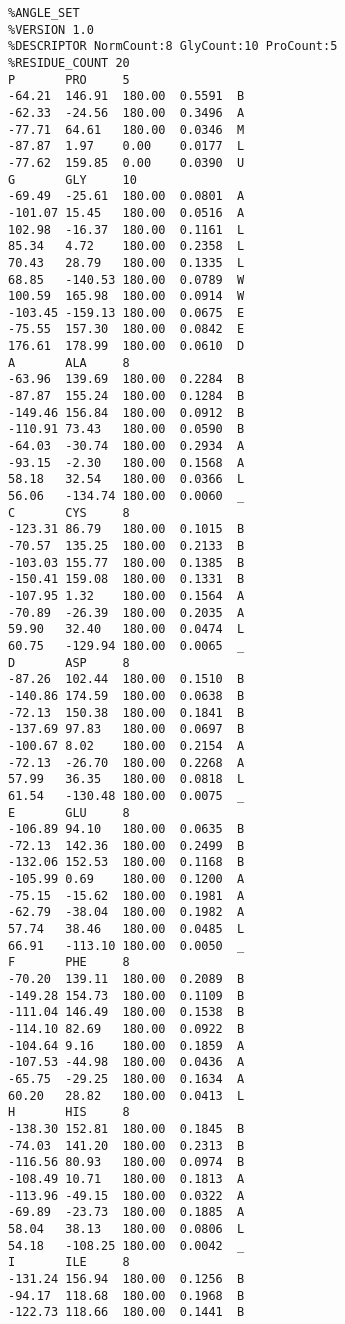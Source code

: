 \begin{small}
\begin{verbatim}
%ANGLE_SET
%VERSION 1.0
%DESCRIPTOR NormCount:8 GlyCount:10 ProCount:5
%RESIDUE_COUNT 20
P       PRO     5               
-64.21  146.91  180.00  0.5591  B
-62.33  -24.56  180.00  0.3496  A
-77.71  64.61   180.00  0.0346  M
-87.87  1.97    0.00    0.0177  L
-77.62  159.85  0.00    0.0390  U
G       GLY     10
-69.49  -25.61  180.00  0.0801  A
-101.07 15.45   180.00  0.0516  A
102.98  -16.37  180.00  0.1161  L
85.34   4.72    180.00  0.2358  L
70.43   28.79   180.00  0.1335  L
68.85   -140.53 180.00  0.0789  W
100.59  165.98  180.00  0.0914  W
-103.45 -159.13 180.00  0.0675  E
-75.55  157.30  180.00  0.0842  E
176.61  178.99  180.00  0.0610  D
A       ALA     8
-63.96  139.69  180.00  0.2284  B
-87.87  155.24  180.00  0.1284  B
-149.46 156.84  180.00  0.0912  B
-110.91 73.43   180.00  0.0590  B
-64.03  -30.74  180.00  0.2934  A
-93.15  -2.30   180.00  0.1568  A
58.18   32.54   180.00  0.0366  L
56.06   -134.74 180.00  0.0060  _
C       CYS     8
-123.31 86.79   180.00  0.1015  B
-70.57  135.25  180.00  0.2133  B
-103.03 155.77  180.00  0.1385  B
-150.41 159.08  180.00  0.1331  B
-107.95 1.32    180.00  0.1564  A
-70.89  -26.39  180.00  0.2035  A
59.90   32.40   180.00  0.0474  L
60.75   -129.94 180.00  0.0065  _
D       ASP     8
-87.26  102.44  180.00  0.1510  B
-140.86 174.59  180.00  0.0638  B
-72.13  150.38  180.00  0.1841  B
-137.69 97.83   180.00  0.0697  B
-100.67 8.02    180.00  0.2154  A
-72.13  -26.70  180.00  0.2268  A
57.99   36.35   180.00  0.0818  L
61.54   -130.48 180.00  0.0075  _
E       GLU     8
-106.89 94.10   180.00  0.0635  B
-72.13  142.36  180.00  0.2499  B
-132.06 152.53  180.00  0.1168  B
-105.99 0.69    180.00  0.1200  A
-75.15  -15.62  180.00  0.1981  A
-62.79  -38.04  180.00  0.1982  A
57.74   38.46   180.00  0.0485  L
66.91   -113.10 180.00  0.0050  _
F       PHE     8
-70.20  139.11  180.00  0.2089  B
-149.28 154.73  180.00  0.1109  B
-111.04 146.49  180.00  0.1538  B
-114.10 82.69   180.00  0.0922  B
-104.64 9.16    180.00  0.1859  A
-107.53 -44.98  180.00  0.0436  A
-65.75  -29.25  180.00  0.1634  A
60.20   28.82   180.00  0.0413  L
H       HIS     8
-138.30 152.81  180.00  0.1845  B
-74.03  141.20  180.00  0.2313  B
-116.56 80.93   180.00  0.0974  B
-108.49 10.71   180.00  0.1813  A
-113.96 -49.15  180.00  0.0322  A
-69.89  -23.73  180.00  0.1885  A
58.04   38.13   180.00  0.0806  L
54.18   -108.25 180.00  0.0042  _
I       ILE     8
-131.24 156.94  180.00  0.1256  B
-94.17  118.68  180.00  0.1968  B
-122.73 118.66  180.00  0.1441  B

\end{verbatim}
\end{small}
